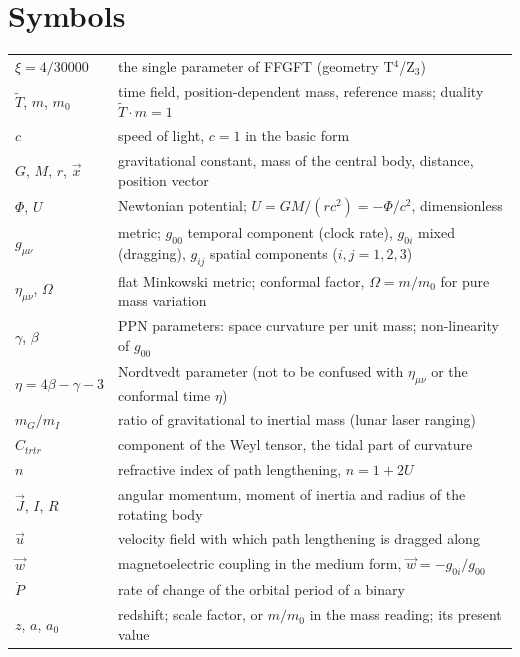 \section*{Symbols}
\begin{center}
\small
\begin{tabular}{@{}p{3.3cm}p{11.2cm}@{}}
\toprule
$\xi=4/30000$ & the single parameter of FFGFT (geometry T$^4$/Z$_3$) \\
$\tilde T$, $m$, $m_0$ & time field, position-dependent mass, reference mass; duality $\tilde T\cdot m=1$ \\
$c$ & speed of light, $c=1$ in the basic form \\
$G$, $M$, $r$, $\vec x$ & gravitational constant, mass of the central body, distance, position vector \\
$\Phi$, $U$ & Newtonian potential; $U=GM/(rc^2)=-\Phi/c^2$, dimensionless \\
$g_{\mu\nu}$ & metric; $g_{00}$ temporal component (clock rate), $g_{0i}$ mixed (dragging),
$g_{ij}$ spatial components ($i,j=1,2,3$) \\
$\eta_{\mu\nu}$, $\Omega$ & flat Minkowski metric; conformal factor, $\Omega=m/m_0$ for pure mass
variation \\
$\gamma$, $\beta$ & PPN parameters: space curvature per unit mass; non-linearity of $g_{00}$ \\
$\eta=4\beta-\gamma-3$ & Nordtvedt parameter (not to be confused with $\eta_{\mu\nu}$ or the conformal
time $\eta$) \\
$m_G/m_I$ & ratio of gravitational to inertial mass (lunar laser ranging) \\
$C_{trtr}$ & component of the Weyl tensor, the tidal part of curvature \\
$n$ & refractive index of path lengthening, $n=1+2U$ \\
$\vec J$, $I$, $R$ & angular momentum, moment of inertia and radius of the rotating body \\
$\vec u$ & velocity field with which path lengthening is dragged along \\
$\vec w$ & magnetoelectric coupling in the medium form, $\vec w=-g_{0i}/g_{00}$ \\
$\dot P$ & rate of change of the orbital period of a binary \\
$z$, $a$, $a_0$ & redshift; scale factor, or $m/m_0$ in the mass reading; its present value \\

\end{tabular}
\end{center}
